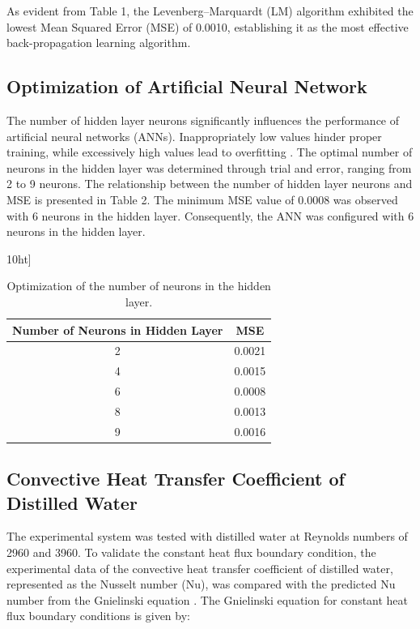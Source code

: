\documentclass{article}
\begin{document}
As evident from Table 1, the Levenberg–Marquardt (LM) algorithm exhibited the lowest Mean Squared Error (MSE) of 0.0010, establishing it as the most effective back-propagation learning algorithm.

\subsection{Optimization of Artificial Neural Network}

The number of hidden layer neurons significantly influences the performance of artificial neural networks (ANNs). Inappropriately low values hinder proper training, while excessively high values lead to overfitting \cite{ref11}. The optimal number of neurons in the hidden layer was determined through trial and error, ranging from 2 to 9 neurons. The relationship between the number of hidden layer neurons and MSE is presented in Table 2. The minimum MSE value of 0.0008 was observed with 6 neurons in the hidden layer. Consequently, the ANN was configured with 6 neurons in the hidden layer.

\begin{table}10ht]
	\centering
	\begin{tabular}{|c|c|}
		\hline
		\textbf{Number of Neurons in Hidden Layer} & \textbf{MSE} \\ \hline
		2                                          & 0.0021      \\ \hline
		4                                          & 0.0015      \\ \hline
		6                                          & 0.0008      \\ \hline
		8                                          & 0.0013      \\ \hline
		9                                          & 0.0016      \\ \hline
	\end{tabular}
	\caption{Optimization of the number of neurons in the hidden layer.}
	\label{tab:hidden_layer_neurons}
\end{table}

\subsection{Convective Heat Transfer Coefficient of Distilled Water}

The experimental system was tested with distilled water at Reynolds numbers of 2960 and 3960. To validate the constant heat flux boundary condition, the experimental data of the convective heat transfer coefficient of distilled water, represented as the Nusselt number (Nu), was compared with the predicted Nu number from the Gnielinski equation \cite{ref9}. The Gnielinski equation for constant heat flux boundary conditions is given by:
\end{document}
